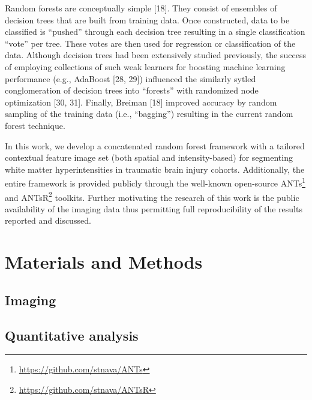 \documentclass[11pt,]{article}
\let\rmarkdownfootnote\footnote%
\def\footnote{\protect\rmarkdownfootnote}
\begin{document}
Random forests are conceptually simple {[}18{]}. They consist of
ensembles of decision trees that are built from training data. Once
constructed, data to be classified is ``pushed'' through each decision
tree resulting in a single classification ``vote'' per tree. These votes
are then used for regression or classification of the data. Although
decision trees had been extensively studied previously, the success of
employing collections of such weak learners for boosting machine
learning performance (e.g., AdaBoost {[}28, 29{]}) influenced the
similarly sytled conglomeration of decision trees into ``forests'' with
randomized node optimization {[}30, 31{]}. Finally, Breiman {[}18{]}
improved accuracy by random sampling of the training data (i.e.,
``bagging'') resulting in the current random forest technique.

In this work, we develop a concatenated random forest framework with a
tailored contextual feature image set (both spatial and intensity-based)
for segmenting white matter hyperintensities in traumatic brain injury
cohorts. Additionally, the entire framework is provided publicly through
the well-known open-source ANTs\footnote{\url{https://github.com/stnava/ANTs}}
and ANTsR\footnote{\url{https://github.com/stnava/ANTsR}} toolkits.
Further motivating the research of this work is the public availability
of the imaging data thus permitting full reproducibility of the results
reported and discussed.

\section{Materials and Methods}\label{materials-and-methods}

\subsection{Imaging}\label{imaging}

\subsection{Quantitative analysis}\label{quantitative-analysis}
\end{document}
